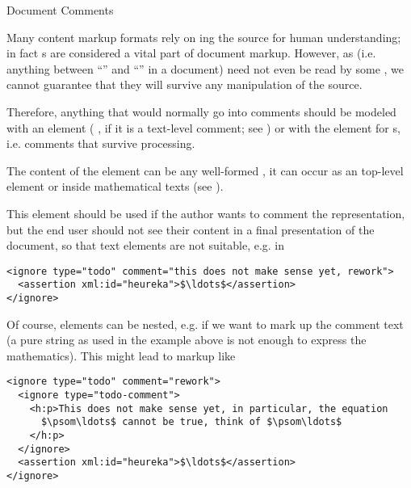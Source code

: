 \begin{omgroup}[id=omdoc-infrastructure,short=Document Infrastructure]
\begin{omgroup}[id=comment]{Document Comments}
\begin{module}[id=comments]
Many content markup formats rely on {ing} the source for human
understanding; in fact {s} are considered a vital part of
document markup. However, as {\xml}  (i.e. anything
between ``{}'' and ``{\snippetin{-->}}'' in a document) need not
even be read by some {\xml} , we cannot guarantee that they
will survive any {\xml} manipulation of the \omdoc source.

Therefore, anything that would normally go into comments should be modeled with an
 element ( ,
if it is a text-level comment; see {}) or with the 
element for {s}, i.e.  comments that survive processing. 

\begin{definition}[id=ignore.def]
  The content of the {} element can be any well-formed \omdoc, it can
  occur as an \omdoc top-level element or inside mathematical texts (see
  {}).
\end{definition}
This element should be used if the author wants to comment the \omdoc representation,
but the end user should not see their content in a final presentation of the document, so
that \omdoc text elements are not suitable, e.g. in

\begin{lstlisting}[numbers=none,index={ignore},mathescape]
<ignore type="todo" comment="this does not make sense yet, rework">
  <assertion xml:id="heureka">$\ldots$</assertion>
</ignore>
\end{lstlisting}

Of course,  elements can be nested, e.g. if we want to mark up
the comment text (a pure string as used in the example above is not enough to
express the mathematics). This might lead to markup like 

\begin{lstlisting}[label=nested-ignore,numbers=none,index={ignore},mathescape]
<ignore type="todo" comment="rework">
  <ignore type="todo-comment">
    <h:p>This does not make sense yet, in particular, the equation 
      $\psom\ldots$ cannot be true, think of $\psom\ldots$
    </h:p>
  </ignore>
  <assertion xml:id="heureka">$\ldots$</assertion>
</ignore>
\end{lstlisting}


\end{module}
\end{omgroup}
\end{omgroup}
